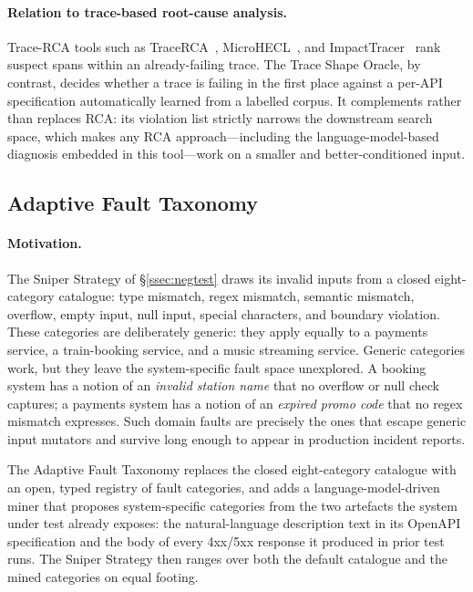 \documentclass[conference]{IEEEtran}
\begin{document}
\paragraph{Relation to trace-based root-cause analysis.}
Trace-RCA tools such as TraceRCA~\cite{li2021tracerca}, MicroHECL~\cite{liu2021microhecl}, and ImpactTracer~\cite{xie2023impacttracer} rank suspect spans within an already-failing trace. The Trace Shape Oracle, by contrast, decides whether a trace is failing in the first place against a per-API specification automatically learned from a labelled corpus. It complements rather than replaces RCA: its violation list strictly narrows the downstream search space, which makes any RCA approach---including the language-model-based diagnosis embedded in this tool---work on a smaller and better-conditioned input.

\subsection{Adaptive Fault Taxonomy}\label{ssec:adaptfault}

\paragraph{Motivation.}
The Sniper Strategy of \S\ref{ssec:negtest} draws its invalid inputs from a closed eight-category catalogue: type mismatch, regex mismatch, semantic mismatch, overflow, empty input, null input, special characters, and boundary violation. These categories are deliberately generic: they apply equally to a payments service, a train-booking service, and a music streaming service. Generic categories work, but they leave the system-specific fault space unexplored. A booking system has a notion of an \emph{invalid station name} that no overflow or null check captures; a payments system has a notion of an \emph{expired promo code} that no regex mismatch expresses. Such domain faults are precisely the ones that escape generic input mutators and survive long enough to appear in production incident reports.

The Adaptive Fault Taxonomy replaces the closed eight-category catalogue with an open, typed registry of fault categories, and adds a language-model-driven miner that proposes system-specific categories from the two artefacts the system under test already exposes: the natural-language description text in its OpenAPI specification and the body of every 4xx/5xx response it produced in prior test runs. The Sniper Strategy then ranges over both the default catalogue and the mined categories on equal footing.
\end{document}
